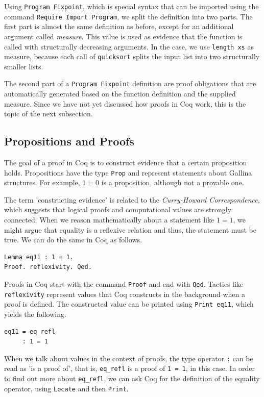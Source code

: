 \documentclass[a4paper, 11pt, fleqn, twoside]{scrreprt}
\newcommand{\cinl}[1]{\texttt{#1}}
\begin{document}
Using \cinl{Program Fixpoint}, which is special syntax that can be imported using the command \cinl{Require Import Program}, we split the definition into two parts.
The first part is almost the same definition as before, except for an additional argument called \textit{measure}.
This value is used as evidence that the function is called with structurally decreasing arguments.
In the case, we use \cinl{length xs} as measure, because each call of \cinl{quicksort} splits the input list into two structurally smaller lists.

The second part of a \cinl{Program Fixpoint} definition are proof obligations that are automatically generated based on the function definition and the supplied measure.
Since we have not yet discussed how proofs in Coq work, this is the topic of the next subsection.

\subsection{Propositions and Proofs}

The goal of a proof in Coq is to construct evidence that a certain proposition holds.
Propositions have the type \cinl{Prop} and represent statements about Gallina structures.
For example, $1 = 0$ is a proposition, although not a provable one.

The term 'constructing evidence' is related to the \textit{Curry-Howard Correspondence}, which suggests that logical proofs and computational values are strongly connected.
When we reason mathematically about a statement like $1 = 1$, we might argue that equality is a reflexive relation and thus, the statement must be true.
We can do the same in Coq as follows.

\begin{verbatim}
Lemma eq11 : 1 = 1.
Proof. reflexivity. Qed.
\end{verbatim}

Proofs in Coq start with the command \cinl{Proof} and end with \cinl{Qed}.
Tactics like \cinl{reflexivity} represent values that Coq constructs in the background when a proof is defined.
The constructed value can be printed using \cinl{Print eq11}, which yields the following.

\begin{verbatim}
eq11 = eq_refl
     : 1 = 1
\end{verbatim}

When we talk about values in the context of proofs, the type operator \cinl{:} can be read as 'is a proof of', that is, \cinl{eq_refl} is a proof of \cinl{1 = 1}, in this case.
In order to find out more about \cinl{eq_refl}, we can ask Coq for the definition of the equality operator, using \cinl{Locate} and then \cinl{Print}.
\end{document}
